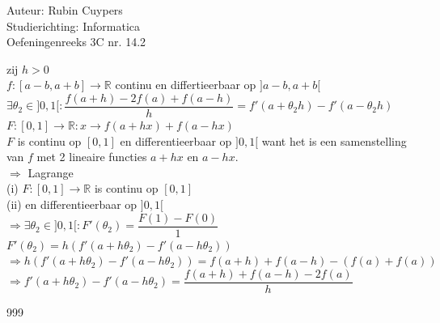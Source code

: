 \documentclass[a4paper]{article}
\begin{document}
  
\noindent \large Auteur: Rubin Cuypers \\
\noindent \large Studierichting: Informatica\\
\noindent \large Oefeningenreeks 3C nr. 14.2\\

\medskip

\normalsize
zij $h>0$\\

$ f:[a-b,a+b] \rightarrow \mathbb{R}$ continu en differtieerbaar op $ ]a-b,a+b[$\\

$\exists \theta_2 \in ]0,1[ : \dfrac{f(a+h)-2f(a)+f(a-h)}{h}=f'(a+\theta_2h)-f'(a-\theta_2h)$\\

$F:[0,1] \rightarrow \mathbb{R} : x \rightarrow f(a+hx)+f(a-hx)$\\

$F$ is continu op $[0,1]$ en differentieerbaar op $ ]0,1[ $ want het is een samenstelling van $f$ met 2 lineaire functies $a+hx$ en $a-hx$.\\

$\Rightarrow$ Lagrange\\

(i) $ F:[0,1] \rightarrow \mathbb{R} $ is continu op $[0,1]$\\

(ii) en differentieerbaar op $]0,1[$\\

$\Rightarrow \exists \theta_2 \in ]0,1[ : F'(\theta_2) =\dfrac{F(1)-F(0)}{1}$\\

$F'(\theta_2)=h(f'(a+h\theta_2)-f'(a-h\theta_2))$\\

$\Rightarrow h(f'(a+h\theta_2)-f'(a-h\theta_2))=f(a+h)+f(a-h)-(f(a)+f(a))$\\

$\Rightarrow f'(a+h\theta_2)-f'(a-h\theta_2)=\dfrac{f(a+h)+f(a-h)-2f(a)}{h}$\\


\begin{thebibliography}{999}
\end{thebibliography}
\end{document}
